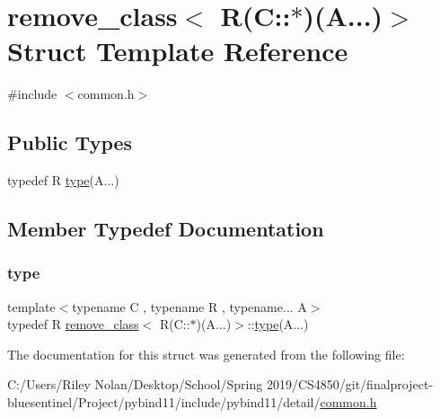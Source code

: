 \hypertarget{structremove__class_3_01_r_07_c_1_1_5_08_07_a_8_8_8_08_4}{}\section{remove\+\_\+class$<$ R(C\+::$\ast$)(A...)$>$ Struct Template Reference}
\label{structremove__class_3_01_r_07_c_1_1_5_08_07_a_8_8_8_08_4}


{\ttfamily \#include $<$common.\+h$>$}

\subsection*{Public Types}
\begin{DoxyCompactItemize}
\item 
typedef R \mbox{\hyperlink{structremove__class_3_01_r_07_c_1_1_5_08_07_a_8_8_8_08_4_a523af5b571ef45044ed8c4df7bf4a4c7}{type}}(A...)
\end{DoxyCompactItemize}


\subsection{Member Typedef Documentation}
\mbox{\label{structremove__class_3_01_r_07_c_1_1_5_08_07_a_8_8_8_08_4_a523af5b571ef45044ed8c4df7bf4a4c7}} 
\subsubsection{\texorpdfstring{type}{type}}
{\footnotesize\ttfamily template$<$typename C , typename R , typename... A$>$ \\
typedef R \mbox{\hyperlink{structremove__class}{remove\+\_\+class}}$<$ R(C\+::$\ast$)(A...)$>$\+::\mbox{\hyperlink{_s_d_l__opengl_8h_ad5ddf6fca7b585646515660e810e0188}{type}}(A...)}



The documentation for this struct was generated from the following file\+:\begin{DoxyCompactItemize}
\item 
C\+:/\+Users/\+Riley Nolan/\+Desktop/\+School/\+Spring 2019/\+C\+S4850/git/finalproject-\/bluesentinel/\+Project/pybind11/include/pybind11/detail/\mbox{\hyperlink{detail_2common_8h}{common.\+h}}\end{DoxyCompactItemize}
